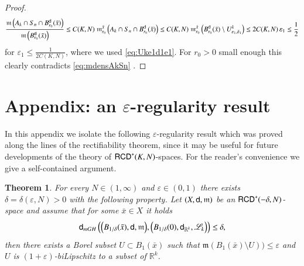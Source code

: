 \documentclass[11pt,reqno]{amsart}
\newcommand{\mm}{\mathfrak m}
\newcommand{\sfd}{{\sf d}}
\newcommand{\LL}{\mathscr{L}}
\newcommand{\R}{\mathbb{R}}
\newcommand{\RCD}{{\sf RCD}}
\newcommand{\vare}{\varepsilon}
\newtheorem{theorem}{Theorem}[section]
\theoremstyle{definition}
\theoremstyle{remark}
\theoremstyle{remark}
\theoremstyle{remark}
\theoremstyle{remark}
\theoremstyle{remark}
\theoremstyle{remark}
\theoremstyle{remark}
\begin{document}
\begin{proof}
$$\frac{ \mm\left(A_k\cap S_n \cap B^{\sfd}_{r_0}(\bar{x})\right)}{\mm\left(B_{r_0}^{\sfd}(\bar{x})\right)}\leq C(K,N) \; \mm^{\bar{x}}_{r_0} \left(A_k\cap S_n \cap B^{\sfd}_{r_0}(\bar{x})\right) \leq C(K,N) \;  \mm^{\bar{x}}_{r_0} \left( B^{\sfd}_{r_0}(\bar{x})\setminus  U^k_{\vare_1,\delta_1} \right)  \leq 2 C(K,N) \, \vare_1 \leq \frac{1}{2}$$
for  $\vare_1\leq \frac{1}{2C(K,N)}$, where we used \eqref{eq:Uke1d1e1}. For $r_0>0$ small enough this clearly contradicts \eqref{eq:mdensAkSn} .
 \end{proof}
 
 \section*{Appendix: an $\varepsilon$-regularity result}
 In this appendix we isolate the following $\varepsilon$-regularity result which was proved along the lines of the rectifiability theorem, since it may be useful for future developments of the theory of $\RCD^{*}(K,N)$-spaces. For the reader's convenience we give a self-contained argument.
 
 \begin{theorem}\label{thm:epsreg1}
  For every  $N\in (1,\infty)$ and $\varepsilon\in (0,1)$ there exists $\delta=\delta(\varepsilon, N)>0$ with the following property. Let $(X,\sfd,\mm)$ be an $\RCD^{*}(-\delta, N)$-space and assume that  for some $\bar{x} \in X$ it holds
 $$\sfd_{mGH} \left( \Big(B_{1/\delta}(\bar{x}) , \sfd, \mm \Big), \Big(B_{1/\delta}(0),\sfd_{\R^k},\LL_k\Big)  \right)  \leq \delta,  $$
 then there exists a Borel subset $U\subset B_{1}(\bar{x})$ such that  $\mm(B_{1}(\bar{x})\setminus U))\leq \varepsilon$ and $U$ is $(1+\varepsilon)$-biLipschitz to a subset of $\R^{k}$. 
 \end{theorem}
 
\end{document}

